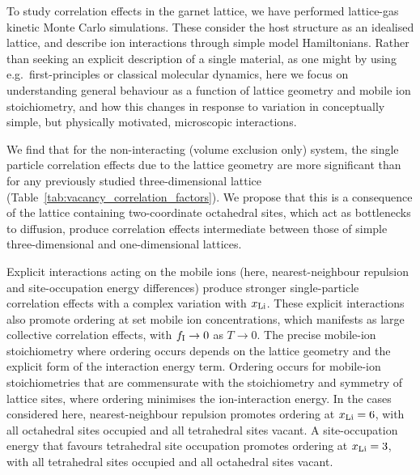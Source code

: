 \documentclass[aps,prb,twocolumn,superscriptaddress,reprint]{revtex4-1}
\newcommand{\xLi}{x_\m{Li}}
\begin{document}
To study correlation effects in the garnet lattice, we have performed  lattice-gas kinetic Monte Carlo simulations.\cite{Morgan_JOSS2017} These consider the host structure as an idealised lattice, and describe ion interactions through simple model Hamiltonians. Rather than seeking an explicit description of a single material, as one might by using e.g.\  first-principles or classical molecular dynamics,\cite{JalemEtAl_ChemMater2013,MeierEtAl_JPhysChemC2014,BurbanoEtAl_PhysRevLett2016} here we focus on understanding general behaviour as a function of lattice geometry and mobile ion stoichiometry, and how this changes in response to variation in conceptually simple, but physically motivated, microscopic interactions.

We find that for the non-interacting (volume exclusion only) system, the single particle correlation effects due to the lattice geometry are more significant than for any previously studied three-dimensional lattice (Table~\ref{tab:vacancy_correlation_factors}). We propose that this is a consequence of the lattice containing two-coordinate octahedral sites, which act as bottlenecks to diffusion, produce correlation effects intermediate between those of simple three-dimensional and one-dimensional lattices. 

Explicit interactions acting on the mobile ions (here, nearest-neighbour repulsion and site-occupation energy differences) produce stronger single-particle correlation effects with a complex variation with $\xLi$. These explicit interactions also promote ordering at set mobile ion concentrations, which manifests as large collective correlation effects, with $f_{\mathrm{I}}\to0$ as $T\to0$.\cite{Murch_SolStatIonics1982} The precise mobile-ion stoichiometry where ordering occurs depends on the lattice geometry and the explicit form of the interaction energy term. Ordering occurs for mobile-ion stoichiometries that are commensurate with the stoichiometry and symmetry of lattice sites, where ordering minimises the ion-interaction energy. In the cases considered here, nearest-neighbour repulsion promotes ordering at $\xLi=6$, with all octahedral sites occupied and all tetrahedral sites vacant. A site-occupation energy that favours tetrahedral site occupation promotes ordering at $\xLi=3$, with all tetrahedral sites occupied and all octahedral sites vacant. 
\end{document}
